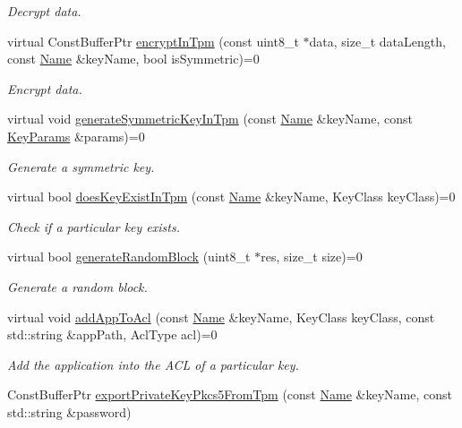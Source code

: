\begin{DoxyCompactItemize}
\begin{DoxyCompactList}\small\item\em Decrypt data. \end{DoxyCompactList}\item 
virtual Const\+Buffer\+Ptr \hyperlink{classndn_1_1SecTpm_acb6b0cb176028beeea885d6f3dbf566e}{encrypt\+In\+Tpm} (const uint8\+\_\+t $\ast$data, size\+\_\+t data\+Length, const \hyperlink{classndn_1_1Name}{Name} \&key\+Name, bool is\+Symmetric)=0
\begin{DoxyCompactList}\small\item\em Encrypt data. \end{DoxyCompactList}\item 
virtual void \hyperlink{classndn_1_1SecTpm_a1a3d4df62e4d6eb74b78991069946f06}{generate\+Symmetric\+Key\+In\+Tpm} (const \hyperlink{classndn_1_1Name}{Name} \&key\+Name, const \hyperlink{classndn_1_1KeyParams}{Key\+Params} \&params)=0
\begin{DoxyCompactList}\small\item\em Generate a symmetric key. \end{DoxyCompactList}\item 
virtual bool \hyperlink{classndn_1_1SecTpm_ab4d5e0587257003957c0ff601b656ccb}{does\+Key\+Exist\+In\+Tpm} (const \hyperlink{classndn_1_1Name}{Name} \&key\+Name, Key\+Class key\+Class)=0
\begin{DoxyCompactList}\small\item\em Check if a particular key exists. \end{DoxyCompactList}\item 
virtual bool \hyperlink{classndn_1_1SecTpm_ada4ed9af55fe93bd26d9c4283c34019e}{generate\+Random\+Block} (uint8\+\_\+t $\ast$res, size\+\_\+t size)=0
\begin{DoxyCompactList}\small\item\em Generate a random block. \end{DoxyCompactList}\item 
virtual void \hyperlink{classndn_1_1SecTpm_a49fe9d4fcdb64160589abb7fb53423ca}{add\+App\+To\+Acl} (const \hyperlink{classndn_1_1Name}{Name} \&key\+Name, Key\+Class key\+Class, const std\+::string \&app\+Path, Acl\+Type acl)=0
\begin{DoxyCompactList}\small\item\em Add the application into the A\+CL of a particular key. \end{DoxyCompactList}\item 
Const\+Buffer\+Ptr \hyperlink{classndn_1_1SecTpm_a4c38b55633d05eafb10cff0967cf63c3}{export\+Private\+Key\+Pkcs5\+From\+Tpm} (const \hyperlink{classndn_1_1Name}{Name} \&key\+Name, const std\+::string \&password)

\end{DoxyCompactItemize}
